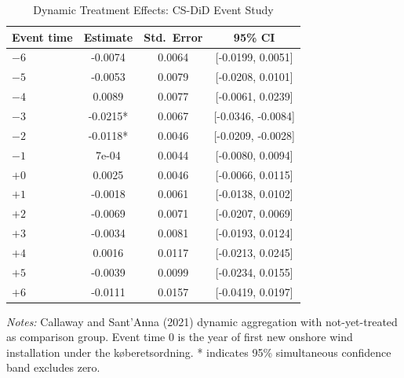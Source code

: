 \begin{table}[!ht]
\centering
\caption{Dynamic Treatment Effects: CS-DiD Event Study}
\label{tab:eventstudy}
\begin{tabular}{lccc}
\hline\hline
Event time & Estimate & Std.~Error & 95\% CI \\
\hline
$-6$ & -0.0074 & 0.0064 & [-0.0199, 0.0051] \\
$-5$ & -0.0053 & 0.0079 & [-0.0208, 0.0101] \\
$-4$ & 0.0089 & 0.0077 & [-0.0061, 0.0239] \\
$-3$ & -0.0215* & 0.0067 & [-0.0346, -0.0084] \\
$-2$ & -0.0118* & 0.0046 & [-0.0209, -0.0028] \\
$-1$ & 7e-04 & 0.0044 & [-0.0080, 0.0094] \\
\hline
$+0$ & 0.0025 & 0.0046 & [-0.0066, 0.0115] \\
$+1$ & -0.0018 & 0.0061 & [-0.0138, 0.0102] \\
$+2$ & -0.0069 & 0.0071 & [-0.0207, 0.0069] \\
$+3$ & -0.0034 & 0.0081 & [-0.0193, 0.0124] \\
$+4$ & 0.0016 & 0.0117 & [-0.0213, 0.0245] \\
$+5$ & -0.0039 & 0.0099 & [-0.0234, 0.0155] \\
$+6$ & -0.0111 & 0.0157 & [-0.0419, 0.0197] \\
\hline\hline
\end{tabular}
\begin{tablenotes}[flushleft]\small
\item \textit{Notes:} Callaway and Sant'Anna (2021) dynamic aggregation
with not-yet-treated as comparison group. Event time 0 is the year of
first new onshore wind installation under the k{\o}beretsordning.
* indicates 95\% simultaneous confidence band excludes zero.
\end{tablenotes}
\end{table}
